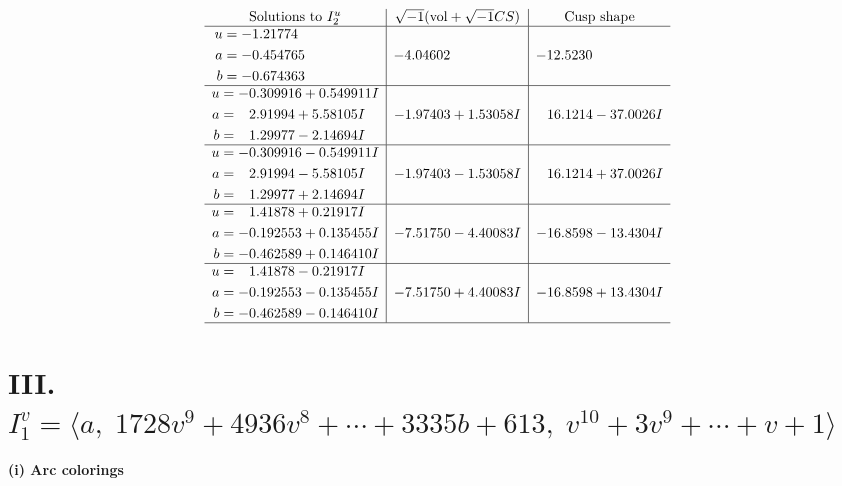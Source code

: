 \documentclass[1p]{elsarticle_modified}
\theoremstyle{definition}
\newcommand{\I}{\sqrt{-1}}
\begin{document}
$$\begin{array}{c|c|c}  
\text{Solutions to }I^u_{2}& \I (\text{vol} + \sqrt{-1}CS) & \text{Cusp shape}\\
 \hline 
\begin{aligned}
u &= -1.21774\phantom{ +0.000000I} \\
a &= -0.454765\phantom{ +0.000000I} \\
b &= -0.674363\phantom{ +0.000000I}\end{aligned}
 & -4.04602\phantom{ +0.000000I} & -12.5230\phantom{ +0.000000I} \\ \hline\begin{aligned}
u &= -0.309916 + 0.549911 I \\
a &= \phantom{-}2.91994 + 5.58105 I \\
b &= \phantom{-}1.29977 - 2.14694 I\end{aligned}
 & -1.97403 + 1.53058 I & \phantom{-}16.1214 - 37.0026 I \\ \hline\begin{aligned}
u &= -0.309916 - 0.549911 I \\
a &= \phantom{-}2.91994 - 5.58105 I \\
b &= \phantom{-}1.29977 + 2.14694 I\end{aligned}
 & -1.97403 - 1.53058 I & \phantom{-}16.1214 + 37.0026 I \\ \hline\begin{aligned}
u &= \phantom{-}1.41878 + 0.21917 I \\
a &= -0.192553 + 0.135455 I \\
b &= -0.462589 + 0.146410 I\end{aligned}
 & -7.51750 - 4.40083 I & -16.8598 - 13.4304 I \\ \hline\begin{aligned}
u &= \phantom{-}1.41878 - 0.21917 I \\
a &= -0.192553 - 0.135455 I \\
b &= -0.462589 - 0.146410 I\end{aligned}
 & -7.51750 + 4.40083 I & -16.8598 + 13.4304 I\\
 \hline 
 \end{array}$$\newpage\newpage\renewcommand{\arraystretch}{1}
\centering \section*{III. $I^v_{1}= \langle a,\;1728 v^9+4936 v^8+\cdots+3335 b+613,\;v^{10}+3 v^9+\cdots+v+1 \rangle$}
\flushleft \textbf{(i) Arc colorings}\\
\end{document}
